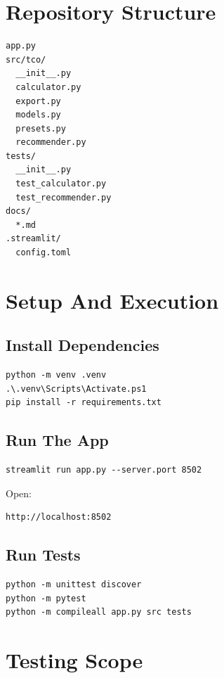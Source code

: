 \documentclass[11pt,a4paper]{article}
\begin{document}
\section{Repository Structure}

\begin{lstlisting}
app.py
src/tco/
  __init__.py
  calculator.py
  export.py
  models.py
  presets.py
  recommender.py
tests/
  __init__.py
  test_calculator.py
  test_recommender.py
docs/
  *.md
.streamlit/
  config.toml
\end{lstlisting}

\section{Setup And Execution}

\subsection{Install Dependencies}

\begin{lstlisting}
python -m venv .venv
.\.venv\Scripts\Activate.ps1
pip install -r requirements.txt
\end{lstlisting}

\subsection{Run The App}

\begin{lstlisting}
streamlit run app.py --server.port 8502
\end{lstlisting}

Open:

\begin{lstlisting}
http://localhost:8502
\end{lstlisting}

\subsection{Run Tests}

\begin{lstlisting}
python -m unittest discover
python -m pytest
python -m compileall app.py src tests
\end{lstlisting}

\section{Testing Scope}
\end{document}
